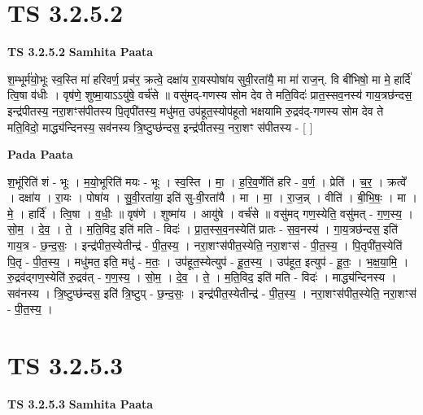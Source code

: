 \documentclass[17pt]{extarticle}
\begin{document}
\section{ TS 3.2.5.2 }

\textbf{TS 3.2.5.2 } \newline
\textbf{Samhita Paata} \newline

श॒म्भूर्म॑यो॒भूः स्व॒स्ति मा॑ हरिवर्ण॒ प्रच॑र॒ क्रत्वे॒ दक्षा॑य रा॒यस्पोषा॑य सुवी॒रता॑यै॒ मा मा॑ राज॒न्. वि बी॑भिषो॒ मा मे॒ हार्दि॑ त्वि॒षा व॑धीः । वृष॑णे॒ शुष्मा॒याऽऽयु॑षे॒ वर्च॑से ॥ वसु॑मद्-गणस्य सोम देव ते मति॒विदः॑ प्रात॒स्सव॒नस्य॑ गाय॒त्रछ॑न्दस॒ इन्द्र॑पीतस्य॒ नरा॒शꣳस॑पीतस्य पि॒तृपी॑तस्य॒ मधु॑मत॒ उप॑हूत॒स्योप॑हूतो भक्षयामि रु॒द्रव॑द्-गणस्य सोम देव ते मति॒विदो॒ माद्ध्य॑न्दिनस्य॒ सव॑नस्य त्रि॒ष्टुप्छ॑न्दस॒ इन्द्र॑पीतस्य॒ नरा॒शꣳ स॑पीतस्य - [  ] \newline

\textbf{Pada Paata} \newline

श॒भूंरिति॑ शं - भूः । म॒यो॒भूरिति॑ मयः - भूः । स्व॒स्ति । मा॒ । ह॒रि॒व॒र्णेति॑ हरि - व॒र्ण॒ । प्रेति॑ । च॒र॒ । क्रत्वे᳚ । दक्षा॑य । रा॒यः । पोषा॑य । सु॒वी॒रता॑या॒ इति॑ सु-वी॒रता॑यै । मा । मा॒ । रा॒ज॒न्न् । वीति॑ । बी॒भि॒षः॒ । मा । मे॒ । हार्दि॑ । त्वि॒षा । व॒धीः॒ ॥ वृष॑णे । शुष्मा॑य । आयु॑षे । वर्च॑से ॥ वसु॑मद् गण॒स्येति॒ वसु॑मत् - ग॒ण॒स्य॒ । सो॒म॒ । दे॒व॒ । ते॒ । म॒ति॒विद॒ इति॑ मति - विदः॑ । प्रा॒त॒स्स॒व॒नस्येति॑ प्रातः - स॒व॒नस्य॑ । गा॒य॒त्रछ॑न्दस॒ इति॑ गाय॒त्र - छ॒न्द॒सः॒ । इन्द्र॑पीत॒स्येतीन्द्र॑ - पी॒त॒स्य॒ । नरा॒शꣳस॑पीत॒स्येति॒ नरा॒शꣳस॑ - पी॒त॒स्य॒ । पि॒तृपी॑त॒स्येति॑ पि॒तृ - पी॒त॒स्य॒ । मधु॑मत॒ इति॒ मधु॑ - म॒तः॒ । उप॑हूत॒स्येत्युप॑ - हू॒त॒स्य॒ । उप॑हूत॒ इत्युप॑ - हू॒तः॒ । भ॒क्ष॒या॒मि॒ । रु॒द्रव॑द्गण॒स्येति॑ रु॒द्रव॑त् - ग॒ण॒स्य॒ । सो॒म॒ । दे॒व॒ । ते॒ । म॒ति॒विद॒ इति॑ मति - विदः॑ । माद्ध्य॑न्दिनस्य । सव॑नस्य । त्रि॒ष्टुप्छ॑न्दस॒ इति॑ त्रि॒ष्टुप् - छ॒न्द॒सः॒ । इन्द्र॑पीत॒स्येतीन्द्र॑ - पी॒त॒स्य॒ । नरा॒शꣳस॑पीत॒स्येति॒ नरा॒शꣳस॑ - पी॒त॒स्य॒ ।  \newline





\section{ TS 3.2.5.3 }

\textbf{TS 3.2.5.3 } \newline
\textbf{Samhita Paata} \newline
\end{document}
